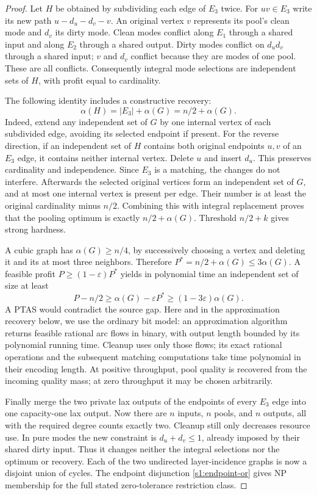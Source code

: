\begin{proof}
Let $H$ be obtained by subdividing each edge of $E_3$ twice. For
$uv\in E_3$ write its new path $u-d_u-d_v-v$. An original vertex $v$
represents its pool's clean mode and $d_v$ its dirty mode. Clean modes
conflict along $E_1$ through a shared input and along $E_2$ through a
shared output. Dirty modes conflict on $d_ud_v$ through a shared input;
$v$ and $d_v$ conflict because they are modes of one pool. These are
all conflicts. Consequently integral mode selections are independent
sets of $H$, with profit equal to cardinality.

The following identity includes a constructive recovery:
\begin{equation}
 \alpha(H)=|E_3|+\alpha(G)=n/2+\alpha(G).\label{s3:is-identity}
\end{equation}
Indeed, extend any independent set of $G$ by one internal vertex of
each subdivided edge, avoiding its selected endpoint if present. For
the reverse direction, if an independent set of $H$ contains both
original endpoints $u,v$ of an $E_3$ edge, it contains neither internal
vertex. Delete $u$ and insert $d_u$. This preserves cardinality and
independence. Since $E_3$ is a matching, the changes do not interfere.
Afterwards the selected original vertices form an independent set of
$G$, and at most one internal vertex is present per edge. Their number
is at least the original cardinality minus $n/2$. Combining this with
integral replacement proves that the pooling optimum is exactly
$n/2+\alpha(G)$. Threshold $n/2+k$ gives strong hardness.

A cubic graph has $\alpha(G)\ge n/4$, by successively choosing a vertex
and deleting it and its at most three neighbors. Therefore
$P^*=n/2+\alpha(G)\le3\alpha(G)$. A feasible profit
$P\ge(1-\varepsilon)P^*$ yields in polynomial time an independent set
of size at least
\begin{equation}
 P-n/2\ge\alpha(G)-\varepsilon P^*
 \ge(1-3\varepsilon)\alpha(G).\label{s3:gap-transfer}
\end{equation}
A PTAS would contradict the source gap. Here and in the approximation
recovery below, we use the ordinary bit model: an approximation algorithm
returns feasible rational arc flows in binary, with output length bounded
by its polynomial running time. Cleanup uses only those flows; its exact
rational operations and the subsequent matching computations take time
polynomial in their encoding length. At positive throughput, pool quality
is recovered from the incoming quality mass; at zero throughput it may
be chosen arbitrarily.

Finally merge the two private lax outputs of the endpoints of every
$E_3$ edge into one capacity-one lax output. Now there are $n$ inputs,
$n$ pools, and $n$ outputs, all with the required degree counts exactly
two. Cleanup still only decreases resource use. In pure modes the new
constraint is $d_u+d_v\le1$, already imposed by their shared dirty input.
Thus it changes neither the integral selections nor the optimum or
recovery. Each of the two undirected layer-incidence graphs is now a
disjoint union of cycles. The endpoint disjunction
\eqref{s1:endpoint-or} gives NP membership for the full stated
zero-tolerance restriction class.
\end{proof}

